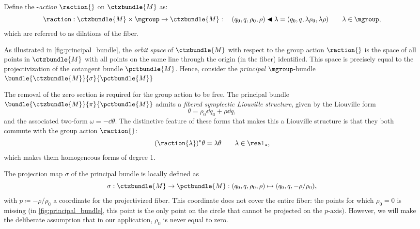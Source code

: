 Define the \mgroup-\emph{action} $\raction{}$ on $\ctzbundle{M}$ as:
$$ \raction: \ctzbundle{M}\times\mgroup \to \ctzbundle{M} : \quad (q_0, q, \rho_0, \rho) \blacktriangleleft \lambda = (q_0, q, \lambda \rho_0, \lambda \rho ) \qquad \lambda \in \mgroup,$$
which are referred to as dilations of the fiber.

As illustrated in \cref{fig:principal_bundle}, the \emph{orbit space} of $\ctzbundle{M}$ with respect to the group action $\raction{}$ is the space of all points in $\ctzbundle{M}$ with all points on the same line through the origin (in the fiber) identified. This space is precisely equal to the projectivization of the cotangent bundle $\pctbundle{M}$. Hence, consider the \emph{principal} $\mgroup$-bundle $\bundle{\ctzbundle{M}}{\sigma}{\pctbundle{M}}$
\begin{center}
\end{center}
The removal of the zero section is required for the group action to be free. The principal bundle $\bundle{\ctzbundle{M}}{\pi}{\pctbundle{M}}$ admits a \emph{fibered symplectic Liouville structure}, given by the Liouville form \cite{Libermann1987}
$$ \theta = \rho_0\dd{q_0} + \rho\dd{q}, $$
and the associated two-form $\omega = -\dd{\theta}$. The distinctive feature of these forms that makes this a Liouville structure is that they both commute with the group action $\raction{}$: \cite{Libermann1987}
$$ (\raction{\lambda})^* \theta = \lambda \theta \qquad \lambda \in \real_*,$$
which makes them homogeneous forms of degree 1.

The projection map $\sigma$ of the principal bundle is locally defined as 
\begin{equation}
    \sigma : \ctzbundle{M} \to \pctbundle{M}: (q_0, q, \rho_0, \rho) \mapsto (q_0, q, -\rho/\rho_0), 
    \label{eq:principal_projection}
\end{equation}
with $p \coloneq -\rho/\rho_0$ a coordinate for the projectivized fiber. This coordinate does not cover the entire fiber: the points for which $\rho_0 = 0$ is missing (in \cref{fig:principal_bundle}, this point is the only point on the circle that cannot be projected on the $p$-axis). However, we will make the deliberate assumption that in our application, $\rho_0$ is never equal to zero.

